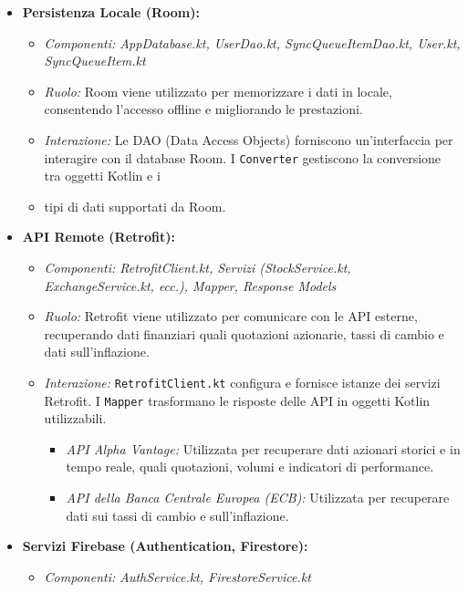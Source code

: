 \begin{itemize}
    \item \textbf{Persistenza Locale (Room):}
    \begin{itemize}
        \item \textit{Componenti: AppDatabase.kt, UserDao.kt,
        SyncQueueItemDao.kt, User.kt, SyncQueueItem.kt}
        \item \textit{Ruolo:} Room viene utilizzato per memorizzare i dati in
        locale, consentendo l'accesso offline e migliorando le prestazioni.
        \item \textit{Interazione:} Le DAO (Data Access Objects) forniscono
        un'interfaccia per interagire con il database Room.
        I \texttt{Converter} gestiscono la conversione tra oggetti Kotlin e i
        \item tipi di dati supportati da Room.
    \end{itemize}
    \item \textbf{API Remote (Retrofit):}
    \begin{itemize}
        \item \textit{Componenti: RetrofitClient.kt, Servizi (StockService.kt,
        ExchangeService.kt, ecc.), Mapper, Response Models}
        \item \textit{Ruolo:} Retrofit viene utilizzato per comunicare con le
        API esterne, recuperando dati finanziari quali quotazioni azionarie,
        tassi di cambio e dati sull'inflazione.
        \item \textit{Interazione:} \texttt{RetrofitClient.kt} configura e
        fornisce istanze dei servizi Retrofit.
        I \texttt{Mapper} trasformano le
        risposte delle API in oggetti Kotlin utilizzabili.
        \begin{itemize}
            \item \textit{API Alpha Vantage:} Utilizzata per recuperare dati
            azionari storici e in tempo reale, quali quotazioni, volumi e
            indicatori di performance.
            \item \textit{API della Banca Centrale Europea (ECB):} Utilizzata
            per recuperare dati sui tassi di cambio e sull'inflazione.
        \end{itemize}
    \end{itemize}
    \item \textbf{Servizi Firebase (Authentication, Firestore):}
    \begin{itemize}
        \item \textit{Componenti: AuthService.kt, FirestoreService.kt}

\end{itemize}
\end{itemize}
